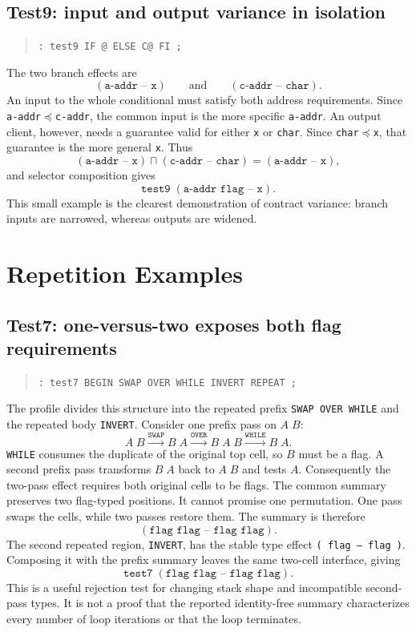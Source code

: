 \documentclass[11pt,a4paper]{article}
\newcommand{\effect}[1]{\mbox{\texttt{#1}}}
\newcommand{\meet}{\mathbin{\sqcap}}
\begin{document}
\subsection{Test9: input and output variance in isolation}

\begin{quote}
\texttt{: test9  IF @ ELSE C@ FI ;}
\end{quote}
The two branch effects are
\[
 (\texttt{a-addr -- x})
 \qquad\text{and}\qquad
 (\texttt{c-addr -- char}).
\]
An input to the whole conditional must satisfy both address requirements.
Since \texttt{a-addr}$\preceq$\texttt{c-addr}, the common input is the more
specific \texttt{a-addr}.  An output client, however, needs a guarantee valid
for either \texttt{x} or \texttt{char}.  Since
\texttt{char}$\preceq$\texttt{x}, that guarantee is the more general
\texttt{x}.  Thus
\[
 (\texttt{a-addr -- x})\meet(\texttt{c-addr -- char})
       =(\texttt{a-addr -- x}),
\]
and selector composition gives
\[
               \texttt{test9}\;(\texttt{a-addr flag -- x}).
\]
This small example is the clearest demonstration of contract variance:
branch inputs are narrowed, whereas outputs are widened.

\section{Repetition Examples}
\label{sec:loop-examples}

\subsection{Test7: one-versus-two exposes both flag requirements}

\begin{quote}
\texttt{: test7  BEGIN SWAP OVER WHILE INVERT REPEAT ;}
\end{quote}
The profile divides this structure into the repeated prefix
\texttt{SWAP OVER WHILE} and the repeated body \texttt{INVERT}.  Consider one
prefix pass on $A\;B$:
\[
 A\;B
 \xrightarrow{\texttt{SWAP}} B\;A
 \xrightarrow{\texttt{OVER}} B\;A\;B
 \xrightarrow{\texttt{WHILE}} B\;A.
\]
\texttt{WHILE} consumes the duplicate of the original top cell, so $B$ must be
a flag.  A second prefix pass transforms $B\;A$ back to $A\;B$ and tests $A$.
Consequently the two-pass effect requires both original cells to be flags.
The common summary preserves two flag-typed positions.  It cannot promise one
permutation.  One pass swaps the cells, while two passes restore them.  The
summary is therefore
\[
                        (\texttt{flag flag -- flag flag}).
\]
The second repeated region, \texttt{INVERT}, has the stable type effect
\effect{( flag -- flag )}.  Composing it with the prefix summary leaves the
same two-cell interface, giving
\[
          \texttt{test7}\;(\texttt{flag flag -- flag flag}).
\]
This is a useful rejection test for changing stack shape and incompatible
second-pass types.  It is not a proof that the reported identity-free summary
characterizes every number of loop iterations or that the loop terminates.
\end{document}
